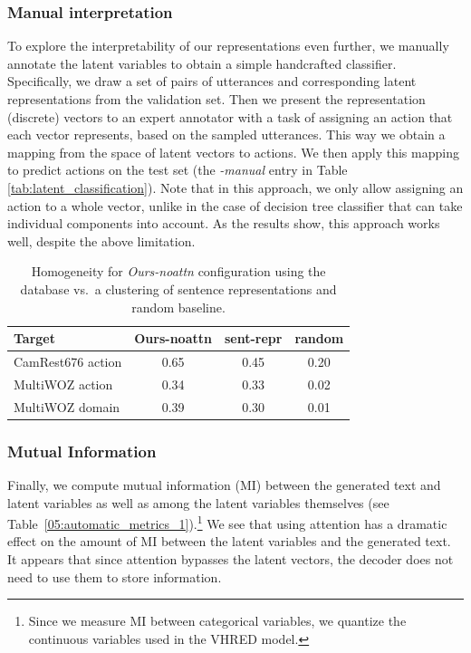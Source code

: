 \subsubsection{Manual interpretation}
\label{sec:manual}
To explore the interpretability of our representations even further, we manually annotate the latent variables to obtain a simple handcrafted classifier.
Specifically, we draw a set of pairs of utterances and corresponding latent representations from the validation set.
Then we present the representation (discrete) vectors to an expert annotator with a task of assigning an action that each vector represents, based on the sampled utterances.
This way we obtain a mapping from the space of latent vectors to actions.
We then apply this mapping to predict actions on the test set (the \textit{-manual} entry in Table \ref{tab:latent_classification}).
Note that in this approach, we only allow assigning an action to a whole vector, unlike in the case of decision tree classifier that can take individual components into account.
As the results show, this approach works well, despite the above limitation.

\begin{table}[tp]
    \centering\small
    \begin{tabular}{l|c|c|c}
      \toprule
      \textbf{Target} & Ours-noattn & sent-repr & random \\
      \midrule
      CamRest676 action & 0.65 & 0.45 & 0.20\\
      MultiWOZ action & 0.34 & 0.33 & 0.02\\
      MultiWOZ domain & 0.39 & 0.30 & 0.01 \\
      \bottomrule
  \end{tabular}
  \caption{Homogeneity for \emph{Ours-noattn} configuration using the database vs.~a clustering of sentence representations and random baseline.}
  \label{tab:homo}
\end{table}

\subsubsection{Mutual Information}
Finally, we compute mutual information (MI) between the generated text and latent variables as well as among the latent variables themselves (see Table~\ref{05:automatic_metrics_1}).\footnote{
Since we measure MI between categorical variables, we quantize the continuous variables used in the VHRED model.}
We see that using attention has a dramatic effect on the amount of MI between the latent variables and the generated text. %
It appears that since attention bypasses the latent vectors, the decoder does not need to use them to store information.

